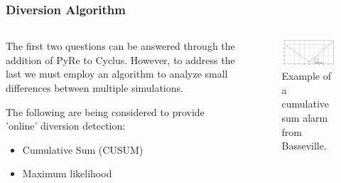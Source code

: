 \begin{frame}
\frametitle{Diversion Algorithm}
\begin{columns}
	\begin{column}{.5\textwidth}
	The first two questions can be answered through the addition of PyRe to Cyclus. However, to address the last we must 
	employ an algorithm to analyze small differences between multiple simulations.

	The following are being considered to provide 'online' diversion detection:
	\begin{itemize}
		\item Cumulative Sum (CUSUM)
		\item Maximum likelihood
	\end{itemize}
	\end{column}
	\begin{column}{.5\textwidth}
		\begin{figure}
		\centering
		\includegraphics[width=\linewidth]{cusum-example}
		\caption{Example of a cumulative sum alarm from Basseville.}
		\label{fig:timeseries-waste}
		\end{figure}
	\end{column}
\end{columns} 
\end{frame}

